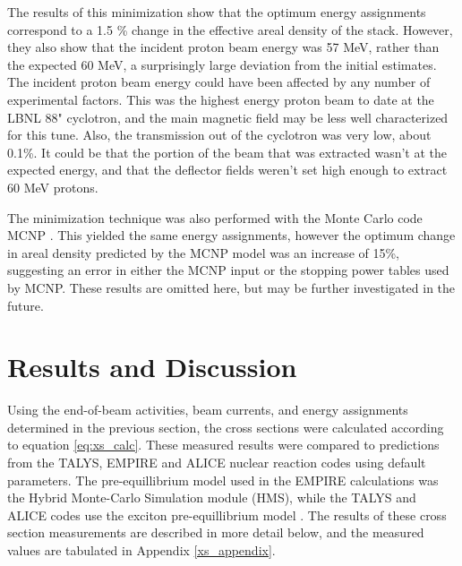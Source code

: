 \documentclass[aps,superscriptaddress,twocolumn,secnumarabic,balancelastpage,amsmath,amssymb,nofootinbib,floatfix]{revtex4-1}
\begin{document}
The results of this minimization show that the optimum energy assignments correspond to a 1.5 \% change in the effective areal density of the stack. However, they also show that the incident proton beam energy was 57 MeV, rather than the expected 60 MeV, a surprisingly large deviation from the initial estimates.  The incident proton beam energy could have been affected by any number of experimental factors.  This was the highest energy proton beam to date at the LBNL 88" cyclotron, and the main magnetic field may be less well characterized for this tune.  Also, the transmission out of the cyclotron was very low, about 0.1\%.  It could be that the portion of the beam that was extracted wasn't at the expected energy, and that the deflector fields weren't set high enough to extract 60 MeV protons.


The minimization technique was also performed with the Monte Carlo code MCNP \cite{MCNP}.  This yielded the same energy assignments, however the optimum change in areal density predicted by the MCNP model was an increase of 15\%, suggesting an error in either the MCNP input or the stopping power tables used by MCNP. These results are omitted here, but may be further investigated in the future.  

\section{Results and Discussion}

Using the end-of-beam activities, beam currents, and energy assignments determined in the previous section, the cross sections were calculated according to equation \ref{eq:xs_calc}.  These measured results were compared to predictions from the TALYS, EMPIRE and ALICE nuclear reaction codes using default parameters.  The pre-equillibrium model used in the EMPIRE calculations was the Hybrid Monte-Carlo Simulation module (HMS), while the TALYS and ALICE codes use the exciton pre-equillibrium model \cite{HERMAN20072655, TALYS, ALICE}. The results of these cross section measurements are described in more detail below, and the measured values are tabulated in Appendix \ref{xs_appendix}.
\end{document}
